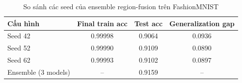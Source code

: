 \begin{table}[H]
\centering
\caption{So sánh các seed của ensemble region-fusion trên FashionMNIST}
\label{tab:fashion-mnist-region-fusion-seed-comparison}
\begin{tabular}{l c c c}
\toprule
Cấu hình & Final train acc & Test acc & Generalization gap \\
\midrule
Seed 42 & 0.99998 & 0.9064 & 0.0936 \\
Seed 52 & 0.99990 & 0.9109 & 0.0890 \\
Seed 62 & 0.99993 & 0.9102 & 0.0897 \\
Ensemble (3 models) & -- & 0.9159 & -- \\
\bottomrule
\end{tabular}
\end{table}

